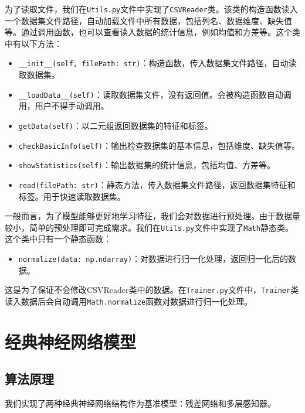\documentclass[10pt,a4paper,twoside]{article}
\numberwithin{figure}{section}%
\numberwithin{table}{section}%
\begin{document}
为了读取文件，我们在\texttt{Utils.py}文件中实现了\texttt{CSVReader}类。该类的构造函数读入一个数据集文件路径，自动加载文件中所有数据，包括列名、数据维度、缺失值等。通过调用函数，也可以查看读入数据的统计信息，例如均值和方差等。这个类中有以下方法：

\begin{itemize}
	\item \texttt{\_\_init\_\_(self, filePath: str)}：构造函数，传入数据集文件路径，自动读取数据集。
	\item \texttt{\_\_loadData\_\_(self)}：读取数据集文件，没有返回值。会被构造函数自动调用，用户不得手动调用。
	\item \texttt{getData(self)}：以二元组返回数据集的特征和标签。
	\item \texttt{checkBasicInfo(self)}：输出检查数据集的基本信息，包括维度、缺失值等。
	\item \texttt{showStatistics(self)}：输出数据集的统计信息，包括均值、方差等。
	\item \texttt{read(filePath: str)}：静态方法，传入数据集文件路径，返回数据集特征和标签。用于快速读取数据集。
\end{itemize}

一般而言，为了模型能够更好地学习特征，我们会对数据进行预处理。由于数据量较小，简单的预处理即可完成需求。我们在\texttt{Utils.py}文件中实现了\texttt{Math}静态类。这个类中只有一个静态函数：

\begin{itemize}
	\item \texttt{normalize(data: np.ndarray)}：对数据进行归一化处理，返回归一化后的数据。
\end{itemize}

这是为了保证不会修改CSVReader类中的数据。在\texttt{Trainer.py}文件中，\texttt{Trainer}类读入数据后会自动调用\texttt{Math.normalize}函数对数据进行归一化处理。


\section{经典神经网络模型}

\subsection{算法原理}
我们实现了两种经典神经网络结构作为基准模型：残差网络和多层感知器。
\end{document}
